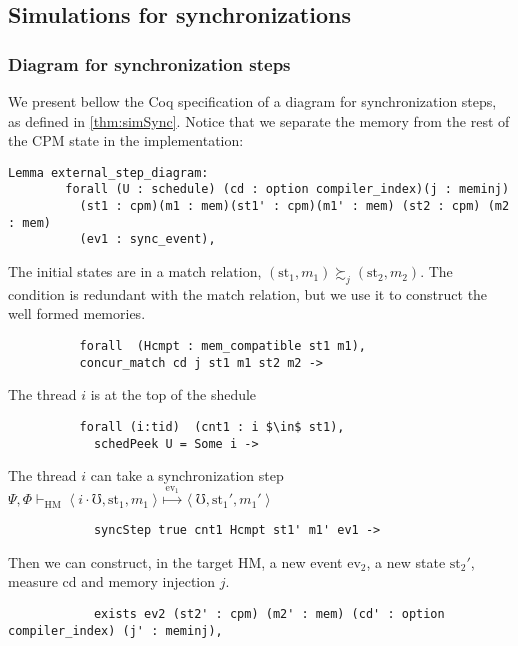 

\subsection{Simulations for synchronizations}\label{code:syncsim}
\subsubsection{Diagram for synchronization steps}
We present bellow the Coq specification of a diagram for synchronization steps, as defined in \cref{thm:simSync}. Notice that we separate the memory from the rest of the CPM state in the implementation:
\begin{lstlisting}[firstnumber=1]
      Lemma external_step_diagram:
        forall (U : schedule) (cd : option compiler_index)(j : meminj)
          (st1 : cpm)(m1 : mem)(st1' : cpm)(m1' : mem) (st2 : cpm) (m2 : mem)
          (ev1 : sync_event),
\end{lstlisting}     
\noindent The initial states are in a match relation,  $(\text{st}_1, m_1) \succsim_{j} (\text{st}_2, m_2)$. 
The condition  is redundant with the match relation, but we use it to construct the well formed memories. 
\begin{lstlisting}
          forall  (Hcmpt : mem_compatible st1 m1),
          concur_match cd j st1 m1 st2 m2 ->
\end{lstlisting}     
\noindent The thread $i$ is at the top of the shedule  
\begin{lstlisting}
          forall (i:tid)  (cnt1 : i $\in$ st1),
            schedPeek U = Some i ->
\end{lstlisting}     
\noindent The thread $i$ can take a synchronization step $\Psi,\Phi \vdash_\mathrm{HM} 
\left<i\cdot\mho, \text{st}_1, m_1 \right>
\!\!\stackrel{\mathrm{ev}_1}\mapsto\!\!
\left<\mho, \text{st}_1', m_1' \right>$
\begin{lstlisting}
            syncStep true cnt1 Hcmpt st1' m1' ev1 ->
\end{lstlisting}     
\noindent Then we can construct, in the target HM, a new event $\text{ev}_2$, a new state $\text{st}_2'$, measure cd and memory injection $j$.
\begin{lstlisting}
            exists ev2 (st2' : cpm) (m2' : mem) (cd' : option compiler_index) (j' : meminj),
\end{lstlisting}     

